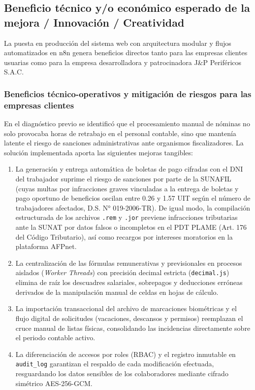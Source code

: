 \subsection{Beneficio técnico y/o económico esperado de la mejora / Innovación / Creatividad}

La puesta en producción del sistema web con arquitectura modular y flujos automatizados en n8n genera beneficios directos tanto 
para las empresas clientes usuarias como para la empresa desarrolladora y patrocinadora J\&P Periféricos S.A.C.

\subsubsection{Beneficios técnico-operativos y mitigación de riesgos para las empresas clientes}
En el diagnóstico previo se identificó que el procesamiento manual de nóminas no solo provocaba horas de retrabajo en el personal contable, 
sino que mantenía latente el riesgo de sanciones administrativas ante organismos fiscalizadores. La solución implementada aporta las siguientes mejoras tangibles:

\begin{enumerate}[leftmargin=*]
    \item La generación y entrega automática de boletas de pago cifradas con el 
    DNI del trabajador suprime el riesgo de sanciones por parte de la SUNAFIL (cuyas multas por infracciones graves vinculadas a la entrega de boletas 
    y pago oportuno de beneficios oscilan entre 0.26 y 1.57 UIT según el número de trabajadores afectados, D.S. N° 019-2006-TR). 
    De igual modo, la compilación estructurada de los archivos \texttt{.rem} y \texttt{.jor} previene infracciones tributarias 
    ante la SUNAT por datos falsos o incompletos en el PDT PLAME (Art. 176 del Código Tributario), 
    así como recargos por intereses moratorios en la plataforma AFPnet.

    \item La centralización de las fórmulas remunerativas y previsionales en procesos aislados (\textit{Worker Threads}) 
    con precisión decimal estricta (\texttt{decimal.js}) elimina de raíz los descuadres salariales, 
    sobrepagos y deducciones erróneas derivados de la manipulación manual de celdas en hojas de cálculo.
    \item La importación transaccional del archivo de marcaciones biométricas 
    y el flujo digital de solicitudes (vacaciones, descansos y permisos) 
    reemplazan el cruce manual de listas físicas, consolidando las incidencias directamente sobre el periodo contable activo.
    \item La diferenciación de accesos por roles (RBAC) y el registro inmutable en 
    \texttt{audit\_log} garantizan el respaldo de cada modificación efectuada, 
    resguardando los datos sensibles de los colaboradores mediante cifrado simétrico AES-256-GCM.

\end{enumerate}

